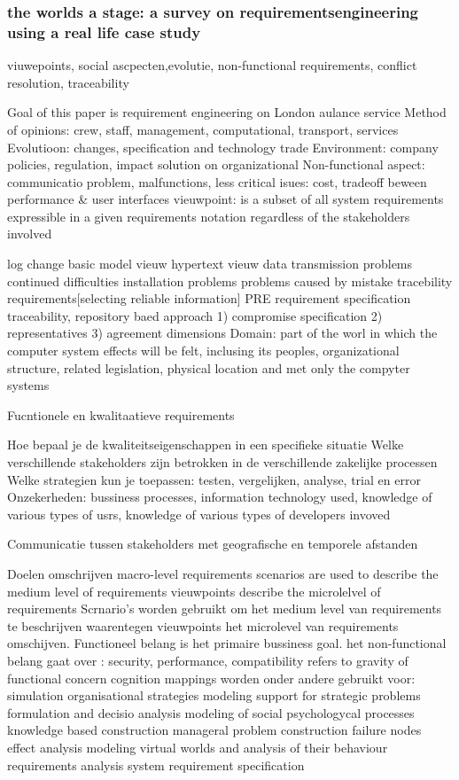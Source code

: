 \subsubsection{the worlds a stage: a survey on requirementsengineering using a real life case study}
viuwepoints, social ascpecten,evolutie, non-functional requirements, conflict resolution, traceability

Goal of this paper is requirement  engineering on London aulance service
Method of opinions: crew, staff, management, computational, transport, services
Evolutioon: changes, specification and technology trade
Environment: company policies, regulation, impact solution on organizational
Non-functional aspect: communicatio problem, malfunctions, less critical isues: cost, tradeoff beween performance \& user interfaces
vieuwpoint: is a subset of all system requirements expressible in a given requirements notation regardless of the stakeholders involved

log change
basic model vieuw
hypertext vieuw
data transmission problems
continued difficulties
installation problems
problems caused by mistake
tracebility requirements[selecting reliable information]
PRE requirement specification traceability, repository baed approach
1) compromise specification
2) representatives
3) agreement dimensions
Domain: part of the worl in which the computer system effects will be felt, inclusing its peoples, organizational structure, related legislation, physical location and met only the compyter systems

Fucntionele en kwalitaatieve requirements

Hoe bepaal je de kwaliteitseigenschappen in een specifieke situatie
Welke verschillende stakeholders zijn betrokken in de verschillende  zakelijke processen
Welke strategien kun je toepassen: testen, vergelijken, analyse, trial en error
Onzekerheden: bussiness processes, information technology used, knowledge of various types of usrs, knowledge of various types of developers invoved

Communicatie tussen stakeholders met geografische en temporele afstanden

Doelen omschrijven macro-level requirements
scenarios are used to describe the medium level of requirements vieuwpoints describe the microlelvel of requirements
Scrnario's worden gebruikt om het medium level van requirements te beschrijven waarentegen vieuwpoints het microlevel van requirements omschijven.
Functioneel belang is het primaire bussiness goal.
het non-functional belang gaat over : security, performance, compatibility refers to gravity of functional concern
cognition mappings worden onder andere gebruikt voor:
simulation
organisational strategies modeling
support for strategic problems
formulation and decisio analysis
modeling of social psychologycal processes
knowledge based construction
manageral problem construction
failure nodes effect analysis
modeling virtual worlds and analysis of their behaviour
requirements analysis
system requirement  specification

